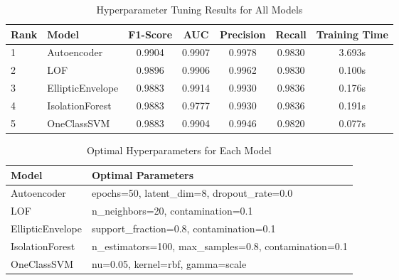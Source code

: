 \begin{table}[htbp]
\centering
\caption{Hyperparameter Tuning Results for All Models}
\label{tab:hyperparameter-results}
\begin{tabular}{|l|l|c|c|c|c|c|}
\hline
\textbf{Rank} & \textbf{Model} & \textbf{F1-Score} & \textbf{AUC} & \textbf{Precision} & \textbf{Recall} & \textbf{Training Time} \\
\hline
1 & Autoencoder & 0.9904 & 0.9907 & 0.9978 & 0.9830 & 3.693s \\
\hline
2 & LOF & 0.9896 & 0.9906 & 0.9962 & 0.9830 & 0.100s \\
\hline
3 & EllipticEnvelope & 0.9883 & 0.9914 & 0.9930 & 0.9836 & 0.176s \\
\hline
4 & IsolationForest & 0.9883 & 0.9777 & 0.9930 & 0.9836 & 0.191s \\
\hline
5 & OneClassSVM & 0.9883 & 0.9904 & 0.9946 & 0.9820 & 0.077s \\
\hline
\end{tabular}
\end{table}

\begin{table}[htbp]
\centering
\caption{Optimal Hyperparameters for Each Model}
\label{tab:optimal-parameters}
\begin{tabular}{|l|p{8cm}|}
\hline
\textbf{Model} & \textbf{Optimal Parameters} \\
\hline
Autoencoder & epochs=50, latent_dim=8, dropout_rate=0.0 \\
\hline
LOF & n_neighbors=20, contamination=0.1 \\
\hline
EllipticEnvelope & support_fraction=0.8, contamination=0.1 \\
\hline
IsolationForest & n_estimators=100, max_samples=0.8, contamination=0.1 \\
\hline
OneClassSVM & nu=0.05, kernel=rbf, gamma=scale \\
\hline
\end{tabular}
\end{table}